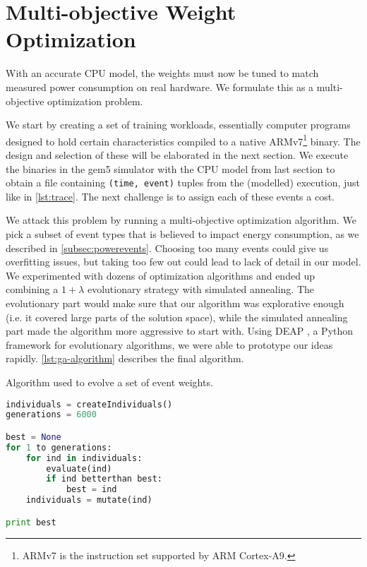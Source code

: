 \section{Multi-objective Weight Optimization}
\label{sec:multiobjective}

With an accurate CPU model, the weights must now be tuned to match measured
power consumption on real hardware. We formulate this as a multi-objective
optimization problem.

We start by creating a set of training workloads, essentially computer programs
designed to hold certain characteristics compiled to a native
ARMv7\footnote{ARMv7 is the instruction set supported by ARM Cortex-A9.} binary.
The design and selection of these will be elaborated in the next section. We
execute the binaries in the gem5 simulator with the CPU model from last
section to obtain a file containing \texttt{(time, event)} tuples from the
(modelled) execution, just like in \autoref{lst:trace}. The next challenge is to
assign each of these events a cost.

We attack this problem by running a multi-objective optimization algorithm. We
pick a subset of event types that is believed to impact energy consumption, as
we described in \autoref{subsec:powerevents}. Choosing too many events could
give us overfitting issues, but taking too few out could lead to lack of detail
in our model. We experimented with dozens of optimization algorithms and ended
up combining a $1 + \lambda$ evolutionary strategy with simulated annealing. The
evolutionary part would make sure that our algorithm was explorative enough
(i.e. it covered large parts of the solution space), while the simulated
annealing part made the algorithm more aggressive to start with. Using DEAP
\cite{DEAP_JMLR2012}, a Python framework for evolutionary algorithms, we were
able to prototype our ideas rapidly. \autoref{lst:ga-algorithm} describes the
final algorithm.

\begin{algorithm}
\caption{Algorithm used to evolve a set of event weights.}
\label{lst:ga-algorithm}
\begin{lstlisting}[language=python,style=algo]
individuals = createIndividuals()
generations = 6000

best = None
for 1 to generations:
    for ind in individuals:
        evaluate(ind)
        if ind betterthan best:
            best = ind
    individuals = mutate(ind)

print best
\end{lstlisting}
\end{algorithm}

